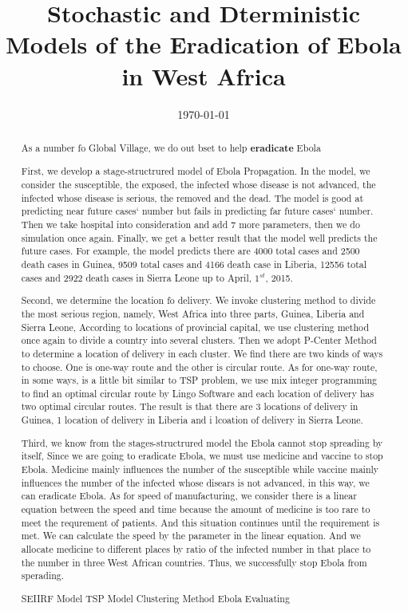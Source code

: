 \documentclass{mcmthesis}
\title{Stochastic and Dterministic Models of the Eradication of
Ebola in West Africa}
\date{\today}
\begin{document}
\begin{abstract}
As a number fo Global Village, we do out bset to help \textbf{eradicate} Ebola

First, we develop a stage-structrured model of Ebola Propagation. In the model, we
consider the susceptible, the exposed, the infected whose disease is not advanced, the infected whose
disease is serious, the removed and the dead. The model is good at predicting near future cases` number
but fails in predicting far future cases` number. Then we take hospital into consideration and add 7 more
parameters, then we do simulation once again. Finally, we get a better result that the model well predicts
the future cases. For example, the model predicts there are 4000 total cases and 2500 death cases in Guinea,
9509 total cases and 4166 death case in Liberia, 12556 total cases and 2922 death cases in Sierra Leone up to 
April, $1^{st}$, 2015.

Second, we determine the location fo delivery. We invoke clustering method to divide the most serious region, namely,
West Africa into three parts, Guinea, Liberia and Sierra Leone, According to locations of provincial capital, we use clustering
method once again to divide a country into several clusters. Then we adopt P-Center Method to determine a location of 
delivery in each cluster. We find there are two kinds of ways to choose. One is one-way route and the other is circular route. As for
one-way route, in some ways, is a little bit similar to TSP problem, we use mix integer programming to find an optimal circular route by
Lingo Software and each location of delivery has two optimal circular routes. The result is that there are 3 locations of delivery in Guinea,
1 location of delivery in Liberia and i lcoation of delivery in Sierra Leone.

Third, we know from the stages-structrured model the Ebola cannot stop spreading by itself, Since we are going to eradicate Ebola, we
must use medicine and vaccine to stop Ebola. Medicine mainly influences the number of the susceptible while vaccine mainly influences
the number of the infected whose disears is not advanced, in this way, we can eradicate Ebola. As for speed of manufacturing, we consider there is
a linear equation between the speed and time because the amount of medicine is too rare to meet the requrement of patients. And this situation continues
until the requirement is met. We can calculate the speed  by the parameter in the linear equation. And we allocate medicine to different places by ratio of
the infected number in that place to the number in three West African countries. Thus, we successfully stop Ebola from sperading.
\begin{keywords}
SEIIRF Model TSP Model Clustering Method Ebola Evaluating
\end{keywords}
\end{abstract}
\maketitle
\tableofcontents
\newpage
\end{document}
